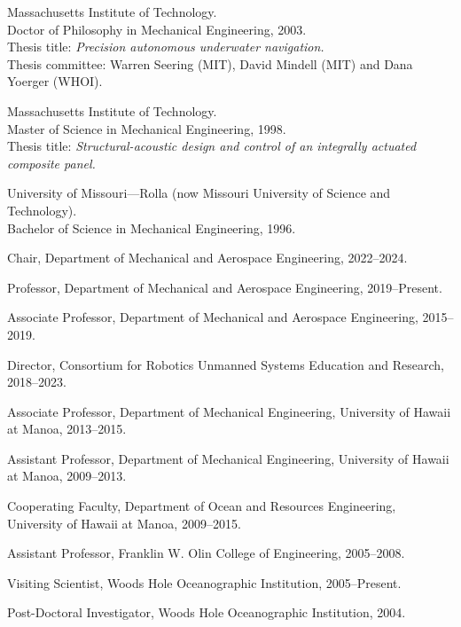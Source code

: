 
\begin{cvitems}
  \item Massachusetts Institute of Technology.\\
        Doctor of Philosophy in Mechanical Engineering, 2003.\\
        Thesis title: \emph{Precision autonomous underwater navigation.}\\
        Thesis committee: Warren Seering (MIT), David Mindell (MIT) and Dana Yoerger (WHOI).
  \item Massachusetts Institute of Technology.\\
        Master of Science in Mechanical Engineering, 1998.\\
        Thesis title: \emph{Structural-acoustic design and control of an integrally actuated composite panel.}
  \item University of Missouri---Rolla (now Missouri University of Science and Technology).\\
        Bachelor of Science in Mechanical Engineering, 1996.
\end{cvitems}

\begin{cvitems}
  \item Chair, Department of Mechanical and Aerospace Engineering, 2022--2024.
  \item Professor, Department of Mechanical and Aerospace Engineering, 2019--Present.
  \item Associate Professor, Department of Mechanical and Aerospace Engineering, 2015--2019.
  \item Director, Consortium for Robotics Unmanned Systems Education and Research, 2018--2023.
\end{cvitems}

\begin{cvitems}
  \item Associate Professor, Department of Mechanical Engineering, University of Hawaii at Manoa, 2013--2015.
  \item Assistant Professor, Department of Mechanical Engineering, University of Hawaii at Manoa, 2009--2013.
  \item Cooperating Faculty, Department of Ocean and Resources Engineering, University of Hawaii at Manoa, 2009--2015.
  \item Assistant Professor, Franklin W. Olin College of Engineering, 2005--2008.
  \item Visiting Scientist, Woods Hole Oceanographic Institution, 2005--Present.
  \item Post-Doctoral Investigator, Woods Hole Oceanographic Institution, 2004.
\end{cvitems}

